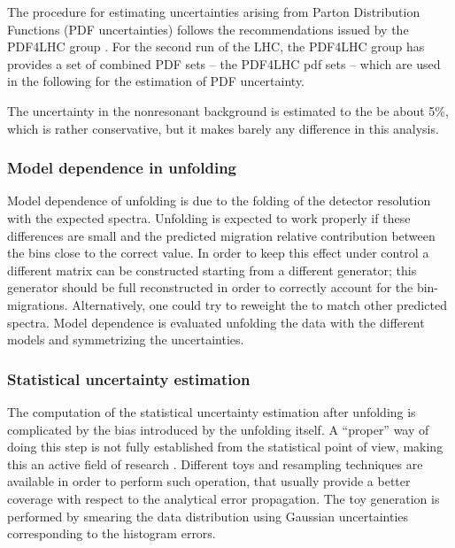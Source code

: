 The procedure for estimating uncertainties arising from Parton
Distribution Functions (PDF uncertainties) follows the recommendations
issued by the PDF4LHC group \cite{Butterworth:2015oua}.
For the second run of the LHC, the PDF4LHC group has provides a set of combined
PDF sets -- the PDF4LHC pdf sets -- which are used in the following for the estimation
of PDF uncertainty.

The uncertainty in the nonresonant background is estimated to the be 
about 5\%, which is rather conservative, but it makes barely any difference in
this analysis.

\subsubsection{Model dependence in unfolding}

Model dependence of unfolding is due to the folding of the detector resolution 
with the expected spectra. Unfolding is expected to work properly if these 
differences are small and the predicted migration relative contribution between 
the bins close to the correct value. In order to keep this effect under control 
a different matrix can be constructed starting from a different \MC{} generator; 
this generator should be full reconstructed in order to correctly account for 
the bin-migrations. Alternatively, one could try to reweight the \MC{} to 
match other predicted spectra. 
Model dependence is evaluated unfolding the data with the different models and 
symmetrizing the uncertainties.

\subsubsection{Statistical uncertainty estimation}

The computation of the statistical uncertainty estimation after unfolding is 
complicated by the bias introduced by the unfolding itself. A ``proper'' way 
of doing this step is not fully established from the statistical point of view, 
making this an active field of research \cite{Prosper:2011zz,kuusela}.
Different toys and resampling techniques are available in order to perform such 
operation, that usually provide a better coverage with respect to the analytical 
error propagation. The toy generation is performed by \RooUnfold{} smearing the 
data distribution using Gaussian uncertainties corresponding to the histogram 
errors.

